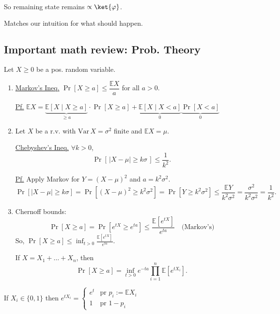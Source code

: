 \documentclass[11pt]{article}
\begin{document}
So remaining state remains $\propto \ket{\varphi}$.

Matches our intuition for what should happen.

\subsection*{Important math review: Prob. Theory}

Let $X\geq 0$ be a pos. random variable.
\begin{enumerate}
\item[\textcircled{1}]
\underline{Markov's Ineq.} $\Pr[X\geq a] \leq \dfrac{\mathbb{E}X}{a}$ for all $a>0$.

\underline{Pf.} $\mathbb{E}X = \underbrace{\mathbb{E}[X\mid X\geq a]}_{\geq a}\cdot\Pr[X\geq a] + \underbrace{\mathbb{E}[X\mid X<a]}_{0}\underbrace{\Pr[X<a]}_{0}$
\end{enumerate}

\begin{enumerate}
\setcounter{enumi}{1}
\item[\textcircled{2}]
Let $X$ be a r.v. with $\mathrm{Var}\,X = \sigma^2$ finite and $\mathbb{E}X = \mu$.

\underline{Chebyshev's Ineq.} $\forall k>0$,
\[
\Pr[\,|X-\mu|\geq k\sigma\,] \leq \frac{1}{k^2}.
\]

\underline{Pf.} Apply Markov for $Y = (X-\mu)^2$ and $a = k^2\sigma^2$.
\[
\Pr[|X-\mu|\geq k\sigma] = \Pr[(X-\mu)^2 \geq k^2\sigma^2] = \Pr[Y\geq k^2\sigma^2] \leq \frac{\mathbb{E}Y}{k^2\sigma^2} = \frac{\sigma^2}{k^2\sigma^2} = \frac{1}{k^2}.
\]
\end{enumerate}

\begin{enumerate}
\setcounter{enumi}{2}
\item[\textcircled{3}] Chernoff bounds:
\[
\Pr[X\geq a] = \Pr[e^{tX}\geq e^{ta}] \leq \frac{\mathbb{E}[e^{tX}]}{e^{ta}} \quad \text{(Markov's)}
\]
So, $\displaystyle \Pr[X\geq a] \leq \inf_{t>0} \frac{\mathbb{E}[e^{tX}]}{e^{ta}}$.

If $X = X_1+\dots+X_n$, then
\[
\Pr[X\geq a] = \inf_{t>0} e^{-ta}\prod_{i=1}^n \mathbb{E}[e^{tX_i}].
\]
\end{enumerate}

If $X_i \in \{0,1\}$ then $e^{tX_i} = \begin{cases} e^t & \text{pr } p_i := \mathbb{E}X_i \\ 1 & \text{pr } 1-p_i \end{cases}$
\end{document}
